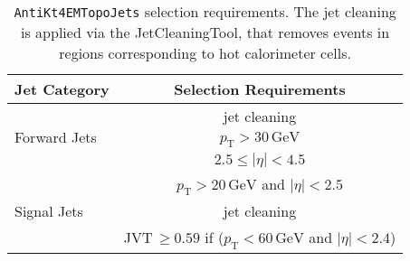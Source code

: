 \begin{table}[tbph]
\begin{center}
\caption{Muon selection requirements.}
\label{tbl:muonsel}
\end{center}
\end{table}

\begin{table}[h]
  \centering
  \begin{tabular}{l c  c  c}
    \hline
    \hline
    \multicolumn{1}{c}{Jet Category} &
    \multicolumn{3}{c}{Selection Requirements} \\
    \hline
    \multirow{3}{*}{Forward Jets} & \multicolumn{3}{c}{jet cleaning} \\
    & \multicolumn{3}{c}{$p_{\mathrm{T}} > 30\,\mathrm{GeV}$} \\
    & \multicolumn{3}{c}{$2.5 \leq \left|\eta\right| < 4.5$} \\ [2ex]
    \hline
    \multirow{3}{*}{Signal Jets} & \multicolumn{3}{c}{$p_{\mathrm{T}} > 20\,\mathrm{GeV}$ and $\left|\eta\right| < 2.5$}\\
    & \multicolumn{3}{c}{jet cleaning} \\
    & \multicolumn{3}{c}{JVT$\,\geq 0.59$ if ($p_{\mathrm{T}} < 60\,\mathrm{GeV}$ and $\left|\eta\right| < 2.4$)}\\
    \hline
    \hline
  \end{tabular}
  \caption[Table caption text]{\texttt{AntiKt4EMTopoJets} selection requirements. The jet 
cleaning is applied via the JetCleaningTool, that removes events in regions corresponding to hot calorimeter cells. }
  \label{JetReqs}
\end{table}
